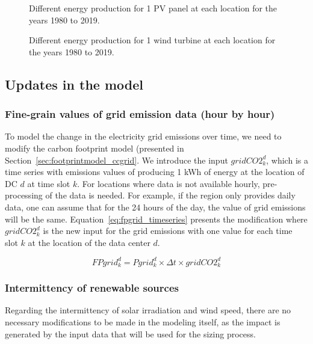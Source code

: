 \begin{figure}[H]
  \centering
  {}
  \caption{Different energy production for 1 PV panel at each location for the years 1980 to 2019.}
  \label{fig:pv_intermitency}
\end{figure}

\begin{figure}[H]
  \centering
  {}
  \caption{Different energy production for 1 wind turbine at each location for the years 1980 to 2019.}
  \label{fig:wt_intermitency}
\end{figure}


\subsection{Updates in the model}

\subsubsection{Fine-grain values of grid emission data (hour by hour)}

To model the change in the electricity grid emissions over time, we need to modify the carbon footprint model (presented in Section~\ref{sec:footprintmodel_ccgrid}. We introduce the input $gridCO2^d_k$, which is a time series with  emissions values of producing 1 kWh of energy at the location of DC $d$ at time slot $k$. For locations where data is not available hourly, pre-processing of the data is needed. For example, if the region only provides daily data, one can assume that for the 24 hours of the day, the value of grid emissions will be the same. Equation~\eqref{eq:fpgrid_timeseries} presents the modification where $gridCO2^d_k$ is the new input for the grid emissions with one value for each time slot $k$ at the location of the data center $d$.

\begin{equation} \label{eq:fpgrid_timeseries}
FPgrid_k^d = Pgrid_k^d\times \Delta t \times gridCO2^d_k
\end{equation}



\subsubsection{Intermittency of renewable sources}

Regarding the intermittency of solar irradiation and wind speed, there are no necessary modifications to be made in the modeling itself, as the impact is generated by the input data that will be used for the sizing process.



